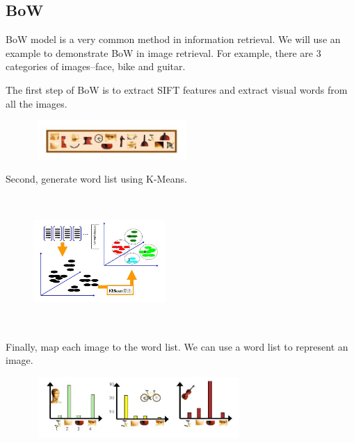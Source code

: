 \documentclass{acm_proc_article-sp}
\begin{document}
\subsection{BoW}
BoW model is a very common method in information retrieval. We will use an example to demonstrate BoW in image retrieval. For example, there are 3 categories of images--face, bike and guitar.\par
The first step of BoW is to extract SIFT features and extract visual words from all the images.\par
\begin{figure}[h!]
\centering
\includegraphics[height=1.5cm ,width=6cm,angle=0]{bow1.jpg}
\end{figure}

Second, generate word list using K-Means.\par
\begin{figure}[h!]
\centering
\includegraphics[height=5cm ,width=5cm,angle=0]{bow2.jpg}
\end{figure}


Finally, map each image to the word list. We can use a word list to represent an image.
\begin{figure}[h!]
\centering
\includegraphics[height=2.3cm ,width=8cm,angle=0]{bow3.jpg}
\end{figure}
\end{document}
